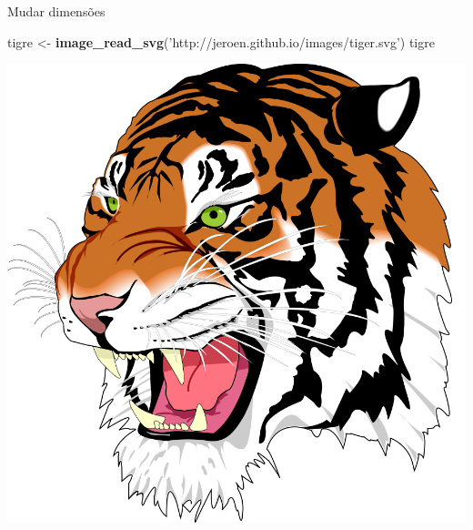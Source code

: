 \documentclass[
  ignorenonframetext,
]{beamer}
\newenvironment{Shaded}{\begin{snugshade}}{\end{snugshade}}
\newcommand{\KeywordTok}[1]{\textcolor[rgb]{0.13,0.29,0.53}{\textbf{#1}}}
\newcommand{\NormalTok}[1]{#1}
\newcommand{\StringTok}[1]{\textcolor[rgb]{0.31,0.60,0.02}{#1}}
\begin{document}
\begin{frame}[fragile]{Mudar dimensões}
\protect\hypertarget{mudar-dimensuxf5es}{}

\small

\begin{Shaded}
\begin{Highlighting}[]
\NormalTok{tigre <-}\StringTok{ }\KeywordTok{image_read_svg}\NormalTok{(}\StringTok{'http://jeroen.github.io/images/tiger.svg'}\NormalTok{)}
\NormalTok{tigre}
\end{Highlighting}
\end{Shaded}

\includegraphics[width=12.5in]{SLIDES_files/figure-beamer/2-1}

\end{frame}
\end{document}
